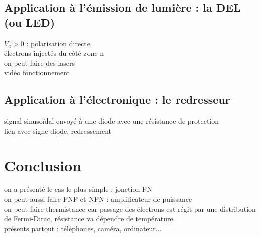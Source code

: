 \subsection{Application à l'émission de lumière : la DEL (ou LED)}
$V_a>0$ : polarisation directe \\
électrons injectés du côté zone n \\
on peut faire des lasers \\
vidéo fonctionnement \\

\subsection{Application à l'électronique : le redresseur}
signal sinusoïdal envoyé à une diode avec une résistance de protection \\
lien avec signe diode, redressement \\

\section*{Conclusion}
on a présenté le cas le plus simple : jonction PN \\
on peut aussi faire PNP et NPN : amplificateur de puissance  \\
on peut faire thermistance car passage des électrons est régit par une distribution de Fermi-Dirac, résistance va dépendre de température \\
présents partout : téléphones, caméra, ordinateur...\\

